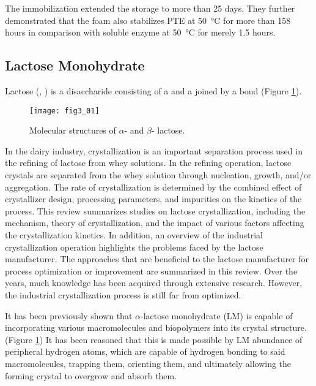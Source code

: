\begin{refsection}
The immobilization extended the storage to more than 25 days. They further
demonstrated that the foam also stabilizes PTE at \SI{50}{\celsius} for more
than 158 hours in comparison with soluble enzyme at \SI{50}{\celsius} for
merely 1.5 hours. 

\subsection{Lactose Monohydrate}

Lactose (,
) is a disaccharide consisting of a  and a
 joined by a  bond (Figure
\ref{fig:lactose-structure}). 
\begin{figure}[h!] \centering \texttt{[image: fig3\_01]}
    \caption[Molecular structures of $\alpha$- and $\beta$- lactose.]{Molecular
    structures of $\alpha$- and $\beta$- lactose.}
    \label{fig:lactose-structure}
\end{figure}

In the dairy industry, crystallization is an important separation
process used in the refining of lactose from whey solutions. In the refining
operation, lactose crystals are separated from the whey solution through
nucleation, growth, and/or aggregation. The rate of crystallization is
determined by the combined effect of crystallizer design, processing
parameters, and impurities on the kinetics of the process. This review
summarizes studies on lactose crystallization, including the mechanism, theory
of crystallization, and the impact of various factors affecting the
crystallization kinetics. In addition, an overview of the industrial
crystallization operation highlights the problems faced by the lactose
manufacturer. The approaches that are beneficial to the lactose manufacturer
for process optimization or improvement are summarized in this review. Over the
years, much knowledge has been acquired through extensive research. However,
the industrial crystallization process is still far from optimized. 

It has been previously shown that $\alpha$-lactose monohydrate (LM) is capable
of incorporating various macromolecules and biopolymers into its crystal
structure\cite{Wang2001a,Kurimoto1999}. (Figure \ref{fig:lactose-structure}) It
has been reasoned that this is made possible by LM abundance of peripheral
hydrogen atoms, which are capable of hydrogen bonding to said macromolecules,
trapping them, orienting them, and ultimately allowing the forming crystal to
overgrow and absorb them.


\end{refsection}

